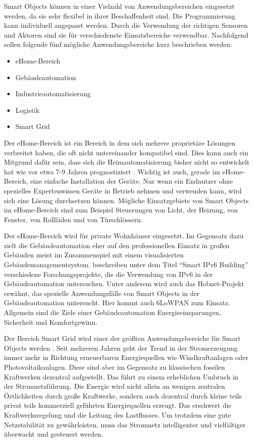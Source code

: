 Smart Objects können in einer Vielzahl von Anwendungsbereichen eingesetzt werden, da sie sehr flexibel in ihrer Beschaffenheit sind. Die Programmierung kann individuell angepasst werden. Durch die Verwendung der richtigen Sensoren und Aktoren sind sie für verschiedenste Einsatzbereiche verwendbar. Nachfolgend sollen folgende fünf mögliche Anwendungsbereiche kurz beschrieben werden:

\begin{itemize}
	\itemsep 0pt
	\item eHome-Bereich
	\item Gebäudeautomation
	\item Industrieautomatisierung
	\item Logistik
	\item Smart Grid
\end{itemize}

Der eHome-Bereich ist ein Bereich in dem sich mehrere proprietäre Lösungen verbreitet haben, die oft nicht untereinander kompatibel sind. Dies kann auch ein Mitgrund dafür sein, dass sich die Heimautomatisierung bisher nicht so entwickelt hat wie vor etwa 7-9 Jahren prognostiziert \citep[360]{vasseur10interconnecting}. Wichtig ist auch, gerade im eHome-Bereich, eine einfache Installation der Geräte. Nur wenn ein Endnutzer ohne spezielles Expertenwissen Geräte in Betrieb nehmen und verwenden kann, wird sich eine Lösung durchsetzen können. Mögliche Einsatzgebiete von Smart Objects im eHome-Bereich sind zum Beispiel Steuerungen von Licht, der Heizung, von Fenster, von Rollläden und von Türschlössern.

Der eHome-Bereich wird für private Wohnhäuser eingesetzt. Im Gegensatz dazu zielt die Gebäudeautomation eher auf den professionellen Einsatz in großen Gebäuden meist im Zusammenspiel mit einem visualisierten Gebäudemanagementsystem. \textcite[Seite 304ff]{Vermesan:TheInternetOfThings} beschreiben unter dem Titel "`Smart IPv6 Building"' verschiedene Forschungsprojekte, die die Verwendung von IPv6 in der Gebäudeautomation untersuchen. Unter anderem wird auch das Hobnet-Projekt erwähnt, das spezielle Anwendungsfälle von Smart Objects in der Gebäudeautomation untersucht. Hier kommt auch 6LoWPAN zum Einsatz. Allgemein sind die Ziele einer Gebäudeautomation Energieeinsparungen, Sicherheit und Komfortgewinn.


Der Bereich Smart Grid wird einer der größten Anwendungsbereiche für Smart Objects werden \citep[Seite 271ff]{Hersent:TheInternetOfThings}. Seit mehreren Jahren geht der Trend in der Stromerzeugung immer mehr in Richtung erneuerbaren Energiequellen wie Windkraftanlagen oder Photovoltaikanlagen. Diese sind aber im Gegensatz zu klassischen fossilen Kraftwerken dezentral aufgestellt. Das führt zu einem erheblichen Umbruch in der Stromnetzführung. Die Energie wird nicht allein an wenigen zentralen Örtlichkeiten durch große Kraftwerke, sondern auch dezentral durch kleine teils privat teils kommerziell geführten Energiequellen erzeugt. Das erschwert die Kraftwerksregelung und die Leitung des Lastflusses. Um trotzdem eine gute Netzstabilität zu gewährleisten, muss das Stromnetz intelligenter und vielfältiger überwacht und gesteuert werden.

